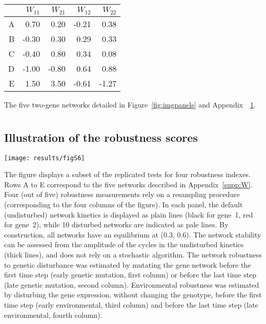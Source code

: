 \documentclass[10pt,a4paper]{article}
\newcommand{\SupMat}{Appendix~}
\begin{document}
\begin{appendices}
	\begin{center}
	\begin{tabular}{rrrrr}
	  \hline
	 & $W_{11}$ & $W_{21}$ & $W_{12}$ & $W_{22}$ \\ 
	  \hline
	  A & 0.70 & 0.20 & -0.21 & 0.38 \\ 
	  B & -0.30 & 0.30 & 0.29 & 0.33 \\ 
	  C & -0.40 & 0.80 & 0.34 & 0.08 \\ 
	  D & -1.00 & -0.80 & 0.64 & 0.88 \\ 
	  E & 1.50 & 3.50 & -0.61 & -1.27 \\ 
	   \hline
	\end{tabular}
	\end{center}
	{\color{Gray} The five two-gene networks detailed in Figure~\ref{fig:imgpanels} and \SupMat~\ref{supp:simpanels}.}

	
  \clearpage
  \section{}
    \label{supp:simpanels}
    \subsection*{Illustration of the robustness scores}

	\begin{adjustwidth}{-1in}{0in}
	\texttt{[image: results/figS6]}
	\end{adjustwidth}
	{\color{Gray} The figure displays a subset of the replicated tests for four robustness indexes. Rows A to E correspond to the five networks described in \SupMat \ref{supp:W}. Four (out of five) robustness measurements rely on a resampling procedure (corresponding to the four columns of the figure). In each panel, the default (undisturbed) network kinetics is displayed as plain lines (black for gene~1, red for gene~2), while 10 disturbed networks are indicated as pale lines. By construction, all networks have an equilibrium at (0.3, 0.6). The network stability can be assessed from the amplitude of the cycles in the undisturbed kinetics (thick lines), and does not rely on a stochastic algorithm. The network robustness to genetic disturbance was estimated by mutating the gene network before the first time step (early genetic mutation, first column) or before the last time step (late genetic mutation, second column). Environmental robustness was estimated by disturbing the gene expression, without changing the genotype, before the first time step (early environmental, third column) and before the last time step (late environmental, fourth column). }



\end{appendices}
\end{document}

